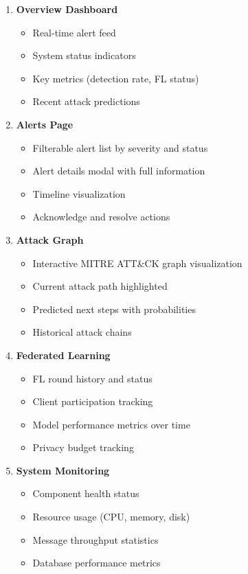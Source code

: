 \documentclass[12pt,a4paper]{article}
\begin{document}
\begin{enumerate}[leftmargin=1cm,itemsep=0pt]
    \item \textbf{Overview Dashboard}
    \begin{itemize}
        \item Real-time alert feed
        \item System status indicators
        \item Key metrics (detection rate, FL status)
        \item Recent attack predictions
    \end{itemize}
    
    \item \textbf{Alerts Page}
    \begin{itemize}
        \item Filterable alert list by severity and status
        \item Alert details modal with full information
        \item Timeline visualization
        \item Acknowledge and resolve actions
    \end{itemize}
    
    \item \textbf{Attack Graph}
    \begin{itemize}
        \item Interactive MITRE ATT\&CK graph visualization
        \item Current attack path highlighted
        \item Predicted next steps with probabilities
        \item Historical attack chains
    \end{itemize}
    
    \item \textbf{Federated Learning}
    \begin{itemize}
        \item FL round history and status
        \item Client participation tracking
        \item Model performance metrics over time
        \item Privacy budget tracking
    \end{itemize}
    
    \item \textbf{System Monitoring}
    \begin{itemize}
        \item Component health status
        \item Resource usage (CPU, memory, disk)
        \item Message throughput statistics
        \item Database performance metrics
    \end{itemize}
\end{enumerate}
\end{document}
